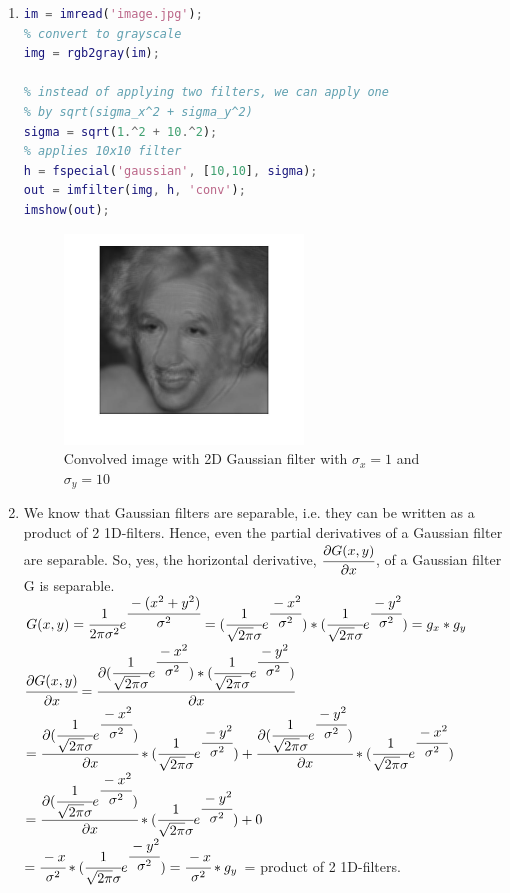 \documentclass{csc_assignment4}
\begin{document}
\begin{description}
\begin{enumerate}[label=(\alph*)]
\item
\begin{lstlisting}[language=MATLAB]
% read image
im = imread('image.jpg');
% convert to grayscale
img = rgb2gray(im);

% instead of applying two filters, we can apply one 
% by sqrt(sigma_x^2 + sigma_y^2)
sigma = sqrt(1.^2 + 10.^2);
% applies 10x10 filter
h = fspecial('gaussian', [10,10], sigma);
out = imfilter(img, h, 'conv');
imshow(out);
\end{lstlisting}
\newpage
\begin{figure}[h]
\includegraphics[width=0.6\textwidth, center]{q2c.jpg}
\vspace*{-20mm}
\caption{Convolved image with 2D Gaussian filter with $\sigma_{x} = 1$ and $\sigma_{y} = 10$}
\end{figure}

\item We know that Gaussian filters are separable, i.e. they can be written as a product of 2 1D-filters. Hence, even the partial derivatives of a Gaussian filter are separable. So, yes, the horizontal derivative, $\cfrac{\partial G(x,y)}{\partial x}$, of a Gaussian filter G is separable. \\ $G(x, y) = \cfrac{1}{2\pi\sigma^{2}}e^{\cfrac{-(x^{2}+y^{2})}{\sigma^{2}}} = 
(\cfrac{1}{\sqrt{2\pi}\sigma}e^{\cfrac{-x^{2}}{\sigma^{2}}}) * (\cfrac{1}{\sqrt{2\pi}\sigma}e^{\cfrac{-y^{2}}{\sigma^{2}}}) = g_{x} * g_{y}$\\
$\cfrac{\partial G(x,y)}{\partial x} = \cfrac{\partial ({\cfrac{1}{\sqrt{2\pi}\sigma}e^{\cfrac{-x^{2}}{\sigma^{2}}}) * (\cfrac{1}{\sqrt{2\pi}\sigma}e^{\cfrac{-y^{2}}{\sigma^{2}}})}}{\partial x}$ \\
$ = \cfrac{\partial ({\cfrac{1}{\sqrt{2\pi}\sigma}e^{\cfrac{-x^{2}}{\sigma^{2}}})}}{\partial x} * ({\cfrac{1}{\sqrt{2\pi}\sigma}e^{\cfrac{-y^{2}}{\sigma^{2}}})} + \cfrac{\partial ({\cfrac{1}{\sqrt{2\pi}\sigma}e^{\cfrac{-y^{2}}{\sigma^{2}}})}}{\partial x} * ({\cfrac{1}{\sqrt{2\pi}\sigma}e^{\cfrac{-x^{2}}{\sigma^{2}}})}$ \\ $ = \cfrac{\partial ({\cfrac{1}{\sqrt{2\pi}\sigma}e^{\cfrac{-x^{2}}{\sigma^{2}}})}}{\partial x} * ({\cfrac{1}{\sqrt{2\pi}\sigma}e^{\cfrac{-y^{2}}{\sigma^{2}}})} + 0$ \\ $ = \cfrac{-x}{\sigma^{2}} * ({\cfrac{1}{\sqrt{2\pi}\sigma}e^{\cfrac{-y^{2}}{\sigma^{2}}})} = \cfrac{-x}{\sigma^{2}} * g_{y}$ = product of 2 1D-filters.


\end{enumerate}
\end{description}
\end{document}

